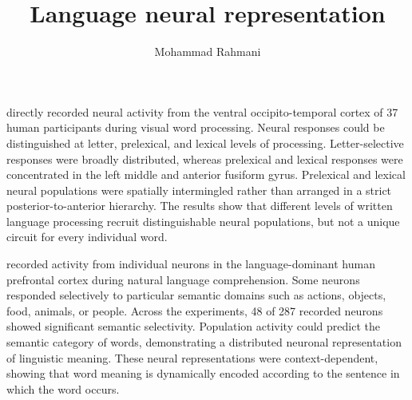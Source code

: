 \documentclass[a4paper]{article}
\title{Language neural representation}
\date{}
\author{Mohammad Rahmani}
\begin{document}
    \maketitle
    
    \cite{lochy-2018-selective-visual-representation-of-letters-and-words-in-the-left-ventral-occipito-temporal-cortex-with-intracerebral-recordings} directly recorded neural activity from the ventral occipito-temporal cortex of 37 human participants during visual word processing. Neural responses could be distinguished at letter, prelexical, and lexical levels of processing. Letter-selective responses were broadly distributed, whereas prelexical and lexical responses were concentrated in the left middle and anterior fusiform gyrus. Prelexical and lexical neural populations were spatially intermingled rather than arranged in a strict posterior-to-anterior hierarchy. The results show that different levels of written language processing recruit distinguishable neural populations, but not a unique circuit for every individual word.
    
    
    \cite{jamali-2024-semantic-encoding-during-language-comprehension-at-single-cell-resolution} recorded activity from individual neurons in the language-dominant human prefrontal cortex during natural language comprehension. Some neurons responded selectively to particular semantic domains such as actions, objects, food, animals, or people. Across the experiments, 48 of 287 recorded neurons showed significant semantic selectivity. Population activity could predict the semantic category of words, demonstrating a distributed neuronal representation of linguistic meaning. These neural representations were context-dependent, showing that word meaning is dynamically encoded according to the sentence in which the word occurs.
    
    
    
    
\end{document}
